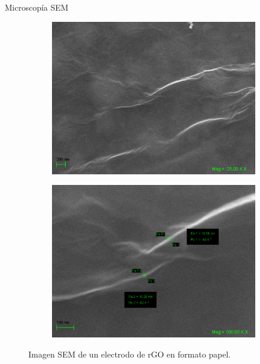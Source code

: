 \documentclass[aspectratio=169]{beamer}
\begin{document}
	\begin{frame}{Microscopía SEM}
		\begin{figure}[h]
			\centering
			\begin{subfigure}{0.45\textwidth}
				\includegraphics[width=\textwidth]{CRGO300517_paper.png}
			\end{subfigure}
			\begin{subfigure}{0.45\textwidth}
				\includegraphics[width=\textwidth]{CRGO300517_paper_measures.png}
			\end{subfigure}
			\caption[Imagen SEM de un electrodo de rGO en formato papel]{Imagen SEM de un electrodo de rGO en formato papel.}
		\end{figure}
	\end{frame}
\end{document}
